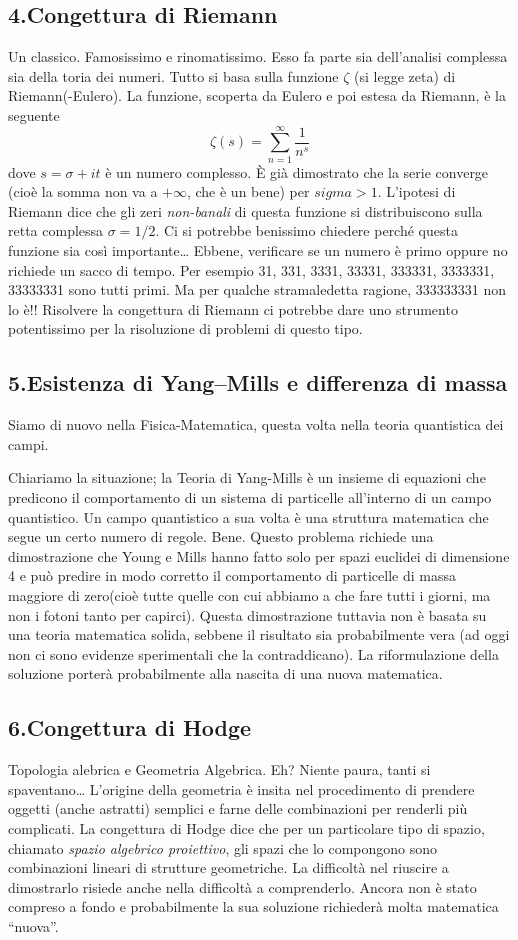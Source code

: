 \subsection{4.Congettura di Riemann}
\label{par:Riemann}
Un classico. Famosissimo e rinomatissimo. Esso fa parte sia dell’analisi complessa sia della toria dei numeri. Tutto si basa sulla funzione $ \zeta$ (si legge zeta) di Riemann(-Eulero). La funzione, scoperta da Eulero e poi estesa da Riemann, è la seguente 
\[ \zeta(s)=\sum_{n=1}^{\infty} \frac{1}{n^s}\]
dove $ s=\sigma + i t$ è un numero complesso. È già dimostrato che la serie converge (cioè la somma non va a $ +\infty$, che è un bene) per $ sigma>1$. L’ipotesi di Riemann dice che gli zeri \emph{non-banali} di questa funzione si distribuiscono sulla retta complessa $ \sigma = 1/2$.
Ci si potrebbe benissimo chiedere perché questa funzione sia così importante… Ebbene, verificare se un numero è primo oppure no richiede un sacco di tempo. Per esempio 31, 331, 3331, 33331, 333331, 3333331, 33333331 sono tutti primi. Ma per qualche stramaledetta ragione, 333333331 non lo è!! Risolvere la congettura di Riemann ci potrebbe dare uno strumento potentissimo per la risoluzione di problemi di questo tipo.

\subsection{5.Esistenza di Yang–Mills e differenza di massa}
Siamo di nuovo nella Fisica-Matematica, questa volta nella teoria quantistica dei campi.

Chiariamo la situazione; la Teoria di Yang-Mills è un insieme di equazioni che predicono il comportamento di un sistema di particelle all’interno di un campo quantistico. Un campo quantistico a sua volta è una struttura matematica che segue un certo numero di regole.  
Bene. Questo problema richiede una dimostrazione che Young e Mills hanno fatto solo per spazi euclidei di dimensione 4 e può predire in modo corretto il comportamento di particelle di massa maggiore di zero(cioè tutte quelle con cui abbiamo a che fare tutti i giorni, ma non i fotoni tanto per capirci). Questa dimostrazione tuttavia non è basata su una teoria matematica solida, sebbene il risultato sia probabilmente vera (ad oggi non ci sono evidenze sperimentali che la contraddicano). La riformulazione della soluzione porterà probabilmente alla nascita di una nuova matematica. 

\subsection{6.Congettura di Hodge}
Topologia alebrica e Geometria Algebrica. Eh? Niente paura, tanti si spaventano… L’origine della geometria è insita nel procedimento di prendere oggetti (anche astratti) semplici e farne delle combinazioni per renderli più complicati. La congettura di Hodge dice che per un particolare tipo di spazio, chiamato \emph{spazio algebrico proiettivo}, gli spazi che lo compongono sono combinazioni lineari di strutture geometriche.
La difficoltà nel riuscire a dimostrarlo risiede anche nella difficoltà a comprenderlo. Ancora non è stato compreso a fondo e probabilmente la sua soluzione richiederà molta matematica “nuova”.


